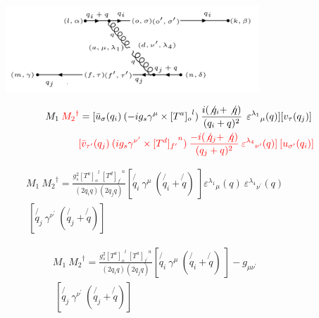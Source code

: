 \begin{figure}[h!]
\centering
\includegraphics[width=0.85\textwidth]{images/M1M2Degaqqg.png}
\end{figure}

\begin{equation}
\begin{split}
M_1\:{\color[RGB]{255,0,0} {M_2}^{\dagger}} = [{\bar{u}}_{\sigma}(q_i)\: (-ig_s \gamma^{\mu}\times {[T^a]_o}^l) \: \frac{i(\not{q_i} + \not{q})}{(q_i + q)^2}\:\: {\varepsilon^{\lambda_1}}_{\mu} (q)] [{v}_{\tau}(q_j)]\: \\
\quad\quad\quad\quad\quad\quad\quad\quad\:\:{\color[RGB]{255,0,0}[\bar{v}_{{\tau}^{\prime}}(q_j) \: (ig_s \gamma^{{\nu}^{\prime}}\times {[T^d]_{f^{\prime}}}^n) \: \frac{-i(\not{q_j} + \not{q})}{(q_j + q)^2} \: {\varepsilon^{\lambda_4}}_{{\nu}^{\prime}} (q)]\: [{u}_{{\sigma}^{\prime}}(q_i)]}
\end{split}
\end{equation}



\begin{equation}
\begin{split}
M_1\: {M_2}^{\dagger} = \frac{g_s^2 {[T^a]_o}^l \:{[T^d]_{f^{\prime}}}^n }{(2q_i q)(2q_j q)} [\not{q_i}\: \gamma^{\mu} \: (\not{q_i} + \not{q})\: ]{\varepsilon^{\lambda_1}}_{\mu} (q) \: {\varepsilon^{\lambda_4}}_{{\nu}^{\prime}} (q) \\
\:[\not{q_j} \:\gamma^{{\nu}^{\prime}} \: (\not{q_j} + \not{q})]\:
\end{split}
\end{equation}

\begin{equation}
\begin{split}
M_1\: {M_2}^{\dagger} = \frac{g_s^2 {[T^a]_o}^l \:{[T^a]_{f^{\prime}}}^n }{(2q_i q)(2q_j q)} [\not{q_i}\: \gamma^{\mu} \: (\not{q_i} + \not{q})\: ] -g_{{\mu}{{\nu}^{\prime}}} \\
\:[\not{q_j} \:\gamma^{{\nu}^{\prime}} \: (\not{q_j} + \not{q})]\:
\end{split}
\end{equation}



